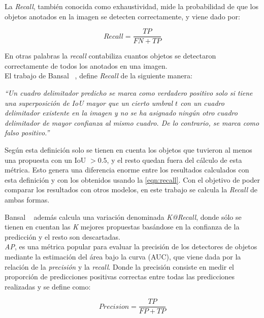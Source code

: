 La \textit{Recall}, también conocida como exhaustividad, mide la probabilidad de que los objetos anotados en la imagen se detecten correctamente, y viene dado por: 

\begin{equation}
	\label{eqn:recall}
	Recall =\frac{TP}{FN+TP}
\end{equation}

En otras palabras la \textit{recall} contabiliza cuantos objetos se detectaron correctamente de todos los anotados en una imagen.\\

El trabajo de Bansal \etal~\cite{bansal2018zero}, define \textit{Recall} de la siguiente manera: 
\begin{center}
	\textit{``Un cuadro delimitador predicho se marca como verdadero positivo solo si tiene una superposición de IoU mayor que un cierto umbral $t$ con un cuadro delimitador existente en la imagen y no se ha asignado ningún otro cuadro delimitador de mayor confianza al mismo cuadro. De lo contrario, se marca como falso positivo.''}\\
\end{center}

Según esta definición solo se tienen en cuenta los objetos que tuvieron al menos una propuesta con un IoU $> 0.5$, y el resto quedan fuera del cálculo de esta métrica. Esto genera una diferencia enorme entre los resultados calculados con esta definición y con los obtenidos usando la \autoref{eqn:recall}. Con el objetivo de poder comparar los resultados con otros modelos, en este trabajo se calcula la \textit{Recall} de ambas formas. 

Bansal \etal~\cite{bansal2018zero} además calcula una variación denominada \textit{K@Recall}, donde sólo se tienen en cuentan las \textit{K} mejores propuestas basándose en la confianza de la predicción y el resto son descartadas.\\


\textit{AP}, es una métrica popular para evaluar la precisión de los detectores de objetos mediante la estimación del área bajo la curva (AUC), que viene dada por la relación de la \textit{precisión} y la \textit{recall}. Donde la precisión consiste en medir el proporción de predicciones positivas correctas entre todas las predicciones realizadas y se define como:

\begin{equation} 
	\label{eqn:precision}
	Precision =\frac{TP}{FP+TP}
\end{equation}


